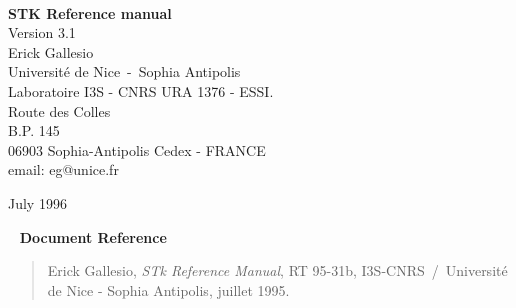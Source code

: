 \documentclass[10pt,a4paper]{book}
\begin{document}
\parindent 0pt                          %


%
% 
\renewcommand{\thechapter}{}                    %
\renewcommand{\thesection}{\arabic{section}}    %

%
%
\newcommand{\stkversion}{3.1}
\newcommand{\stk}{{\sc STk}}
\newcommand{\stklos}{{\sc STklos}}
\newcommand{\doc}{{\em Identical to R$^{4}$RS.}}
\newcommand{\rrrr}{{\em R$^{4}\!RS$}}
\newcommand{\saut}{\vskip2mm}
\newcommand{\tilda}{{\tt\char126}}
\newcommand{\etoile}{{\tt\char42}}
\newcommand{\leftbracket}{{\tt\char91}}
\newcommand{\rightbracket}{{\tt\char93}}
\newcommand{\hyperiii}[1]{\hyper{#1$_3$}}
\newcommand{\clearemptydoublepage}{\newpage{\thispagestyle{empty}\cleardoublepage}}

%
%
\thispagestyle{empty}
\begin{center}   
\ \\[3cm]
{\huge\bf ST{\large\bf{K}} Reference manual}\\[3mm]
{\Large Version \stkversion}\\[3cm]
{\large Erick Gallesio \\
Universit\'e de Nice~-~Sophia Antipolis \\
Laboratoire I3S - CNRS URA 1376 - ESSI. \\
Route des Colles\\
B.P. 145\\
06903 Sophia-Antipolis Cedex - FRANCE\\[3mm]
email: eg@unice.fr}
\end{center}
\vskip8cm
\begin{flushright}
July 1996
\end{flushright}
\newpage
\thispagestyle{empty}
{\ }
\vskip2cm
{\bf Document Reference}
\begin{quote}
Erick Gallesio, {\em STk Reference Manual}, RT 95-31b,
I3S-CNRS~/~Universit\'e de Nice - Sophia Antipolis, juillet 1995.
\end{quote}



\end{document}
